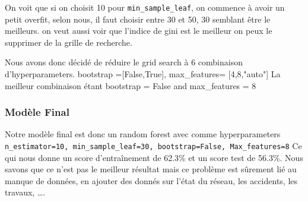 On voit que si on choisit 10 pour \lstinline!min_sample_leaf!, on commence à avoir un petit overfit, selon nous, il faut choisir entre 30 et 50, 30 semblant être le meilleurs. on veut aussi voir que l'indice de gini est le meilleur on peux le supprimer de la grille de recherche.

Nous avons donc décidé de réduire le grid search à 6 combinaison d'hyperparameters.\newline
bootstrap =[False,True], max\_features= [4,8,"auto"]\newline
La meilleur combinaison étant bootstrap = False and max\_features = 8

\subsubsection{Modèle Final}
Notre modèle final est donc un random forest avec comme hyperparameters \lstinline!n_estimator=10, min_sample_leaf=30, bootstrap=False, Max_features=8! Ce qui nous donne un score d'entraînement de 62.3\% et un score test de 56.3\%. \newline
Nous savons que ce n'est pas le meilleur résultat mais ce problème est sûrement lié au manque de données, en ajouter des donnés sur l'état du réseau, les accidents, les travaux, \dots.
